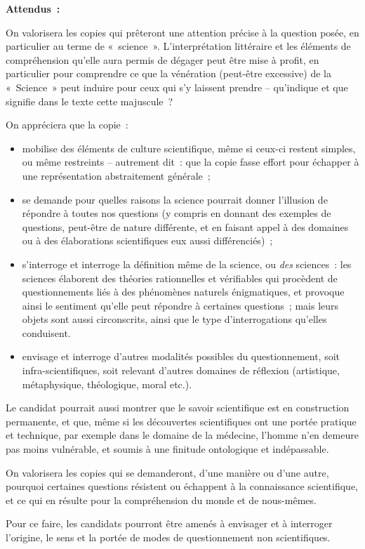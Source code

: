 {\textbf{Attendus~:}

On valorisera les copies qui prêteront une attention précise à la question posée, en
particulier au terme de «~science~». L'interprétation littéraire et les éléments de
compréhension qu'elle aura permis de dégager peut être mise à profit, en particulier
pour comprendre ce que la vénération (peut-être excessive) de la «~Science~» peut
induire pour ceux qui s'y laissent prendre – qu'indique et que signifie dans le texte
cette majuscule~?

On appréciera que la copie~:

\begin{itemize}
\item mobilise des éléments de culture scientifique, même si ceux-ci restent simples,
ou même restreints – autrement dit~: que la copie fasse effort pour échapper à
une représentation abstraitement générale~;
\item se demande pour quelles raisons la science pourrait donner l'illusion de
répondre à toutes nos questions (y compris en donnant des exemples de
questions, peut-être de nature différente, et en faisant appel à des domaines ou
à des élaborations scientifiques eux aussi différenciés)~;
\item s'interroge et interroge la définition même de la science, ou \textit{des} sciences~: les
sciences élaborent des théories rationnelles et vérifiables qui procèdent de
questionnements liés à des phénomènes naturels énigmatiques, et provoque
ainsi le sentiment qu'elle peut répondre à certaines questions~; mais leurs objets
sont aussi circonscrits, ainsi que le type d'interrogations qu'elles conduisent.
\item envisage et interroge d'autres modalités possibles du questionnement, soit
infra-scientifiques, soit relevant d'autres domaines de réflexion (artistique,
métaphysique, théologique, moral etc.).
\end{itemize}

Le candidat pourrait aussi montrer que le savoir scientifique est en construction
permanente, et que, même si les découvertes scientifiques ont une portée pratique et
technique, par exemple dans le domaine de la médecine, l'homme n'en demeure pas
moins vulnérable, et soumis à une finitude ontologique et indépassable.

On valorisera les copies qui se demanderont, d'une manière ou d'une autre, pourquoi
certaines questions résistent ou échappent à la connaissance scientifique, et ce qui
en résulte pour la compréhension du monde et de nous-mêmes.

Pour ce faire, les candidats pourront être amenés à envisager et à interroger l'origine,
le sens et la portée de modes de questionnement non scientifiques.}

